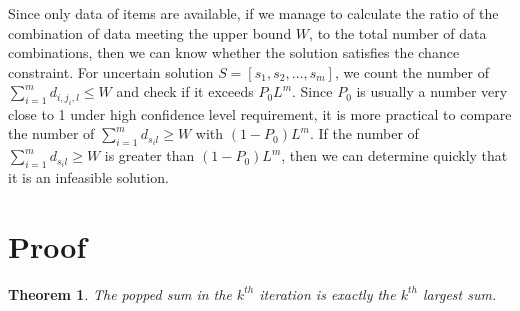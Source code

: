 \documentclass[lettersize,journal]{IEEEtran}
\newtheorem{theorem}{Theorem}[section]
\begin{document}
Since only data of items are available, if we manage to calculate the ratio of the combination of data meeting the upper bound $W$, to the total number of data combinations, then we can know whether the solution satisfies the chance constraint. 
For uncertain solution $S=[s_1,s_2,\ldots,s_m]$, we count the number of $\sum_{i=1}^{m}d_{i,j_i,l}\leq W$ and check if it exceeds $P_0L^m$. 
Since $P_0$ is usually a number very close to 1 under high confidence level requirement, it is more practical to  compare the number of $\sum_{i=1}^{m}d_{s_il}\geq W$ with $(1-P_0)L^m$. 
If the number of $\sum_{i=1}^{m}d_{s_il}\geq W$ is greater than $(1-P_0)L^m$, then we can determine quickly that it is an infeasible solution.

\section{Proof}

\begin{theorem}
The popped sum in the $k^{th}$ iteration is exactly the $k^{th}$ largest sum.
\end{theorem}
\end{document}
